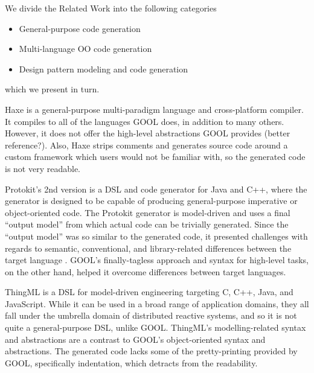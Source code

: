 \documentclass[sigplan,review,anonymous,prologue,dvipsnames]{acmart}
\begin{document}
We divide the Related Work into the following categories
\begin{itemize}
\item General-purpose code generation
\item Multi-language OO code generation
\item Design pattern modeling and code generation
\end{itemize}
which we present in turn.

Haxe is a general-purpose multi-paradigm language and cross-platform compiler. 
It compiles to all of the languages GOOL does, in addition to many others. 
However, it does not offer the high-level abstractions GOOL provides 
\cite{Haxe} (better reference?). Also, Haxe strips comments and generates 
source code around a custom framework which users would not be familiar with, 
so the generated code is not very readable.

Protokit's 2nd version is a DSL and code generator for Java and C++, where the 
generator is designed to be capable of producing general-purpose imperative or 
object-oriented code. The Protokit generator is model-driven and uses a final 
``output model'' from which actual code can be trivially generated. Since the 
``output model'' was so similar to the generated code, it presented challenges 
with regards to semantic, conventional, and library-related differences between 
the target language \cite{kovesdan2017multi}. GOOL's finally-tagless approach 
and syntax for high-level tasks, on the other hand, helped it overcome 
differences between target languages.

ThingML \cite{harrand2016thingml} is a DSL for model-driven engineering 
targeting C, C++, Java, and JavaScript. While it can be used in a broad range 
of application domains, they all fall under the umbrella domain of distributed 
reactive systems, and so it is not quite a general-purpose DSL, unlike GOOL. 
ThingML's modelling-related syntax and abstractions are a contrast to GOOL's 
object-oriented syntax and abstractions. The generated code lacks some of the 
pretty-printing provided by GOOL, specifically indentation, which detracts from 
the readability.
\end{document}
